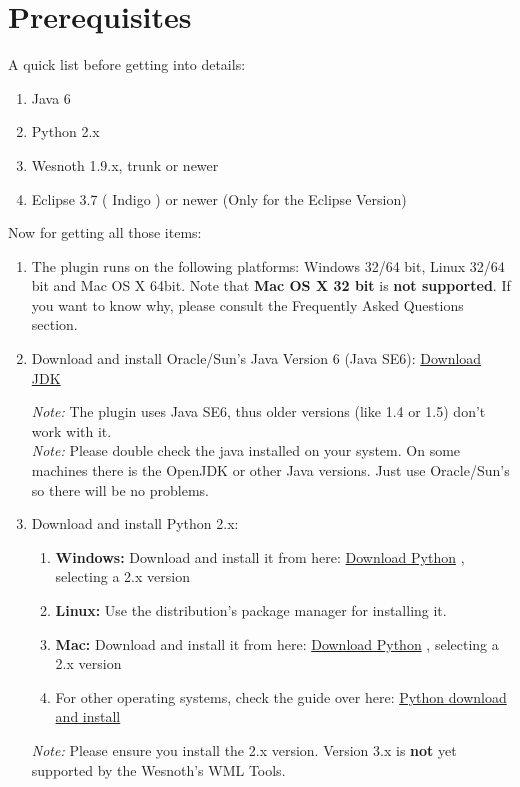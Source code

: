 \documentclass[10pt]{article}
\begin{document}
\section{Prerequisites}
A quick list before getting into details:
\begin{enumerate}
\item Java 6
\item Python 2.x
\item Wesnoth 1.9.x, trunk or newer
\item Eclipse 3.7 ( Indigo ) or newer (Only for the Eclipse Version)
\end{enumerate}

Now for getting all those items:
\begin{enumerate}
\item The plugin runs on the following platforms: Windows 32/64 bit, Linux 32/64 bit and Mac OS X 64bit. Note that \textbf{Mac OS X 32 bit} is \textbf{not supported}. If you want to know why, please consult the Frequently Asked Questions section.
\item Download and install Oracle/Sun's Java Version 6 (Java SE6): \href{http://java.sun.com/javase/downloads/widget/jdk6.jsp}{Download JDK}

\textit{Note:} The plugin uses Java SE6, thus older versions (like 1.4 or 1.5) don't work with it.\\
\textit{Note:} Please double check the java installed on your system. On some machines there is the OpenJDK or other Java versions. Just use Oracle/Sun's so there will be no problems.

\item Download and install Python 2.x:
 \begin{enumerate}
   \item \textbf{Windows:} Download and install it from here: \href{http://python.org/download/}{Download Python} , selecting a 2.x version
   \item \textbf{Linux:} Use the distribution's package manager for installing it.
   \item \textbf{Mac:} Download and install it from here: \href{http://python.org/download/}{Download Python} , selecting a 2.x version
   \item For other operating systems, check the guide over here: \href{http://wiki.python.org/moin/BeginnersGuide/Download}{Python download and install}
  \end{enumerate}
 \textit{Note:} Please ensure you install the 2.x version. Version 3.x is \textbf{not} yet supported by the Wesnoth's WML Tools.


\end{enumerate}
\end{document}
